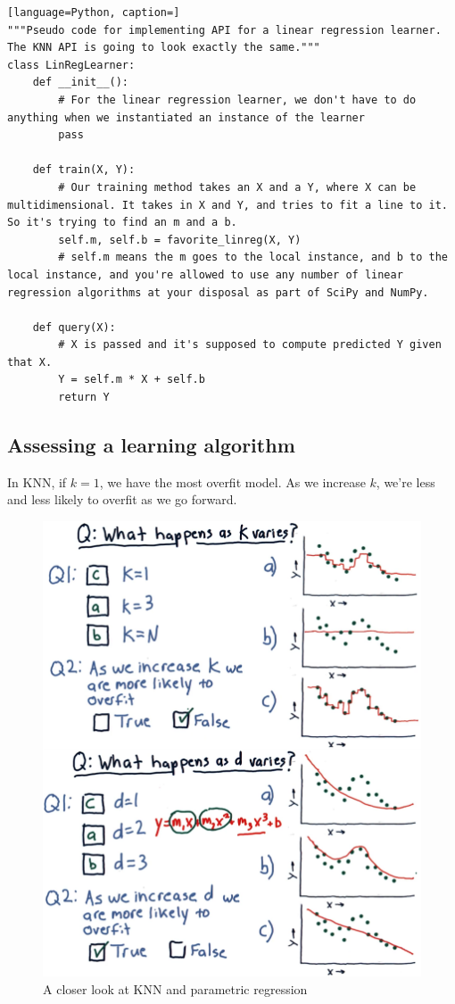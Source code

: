 \documentclass[12pt]{article}
\begin{document}
\begin{lstlisting}[language=Python, caption=]
"""Pseudo code for implementing API for a linear regression learner. The KNN API is going to look exactly the same."""
class LinRegLearner:
    def __init__():
        # For the linear regression learner, we don't have to do anything when we instantiated an instance of the learner
        pass 
        
    def train(X, Y):
        # Our training method takes an X and a Y, where X can be multidimensional. It takes in X and Y, and tries to fit a line to it. So it's trying to find an m and a b. 
        self.m, self.b = favorite_linreg(X, Y) 
        # self.m means the m goes to the local instance, and b to the local instance, and you're allowed to use any number of linear regression algorithms at your disposal as part of SciPy and NumPy. 
        
    def query(X):
        # X is passed and it's supposed to compute predicted Y given that X. 
        Y = self.m * X + self.b
        return Y
\end{lstlisting}

\subsection{Assessing a learning algorithm}

In KNN, if $k=1$, we have the most overfit model. As we increase $k$, we're less and less likely to overfit as we go forward. 

\begin{figure}[!ht]
\centering
\includegraphics[scale=0.45]{fig/fig86}
\caption{A closer look at KNN and parametric regression}
\end{figure}
\end{document}
